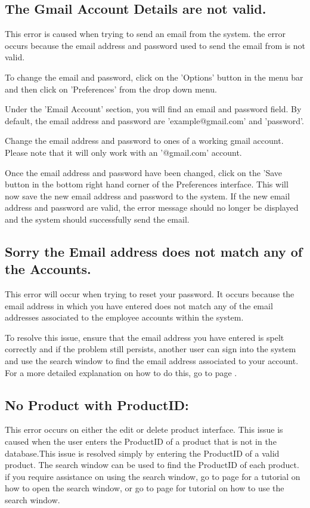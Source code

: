 \subsection{The Gmail Account Details are not valid.}

This error is caused when trying to send an email from the system. the error occurs because the email address and password used to send the email from is not valid.

To change the email and password, click on the 'Options' button in the menu bar and then click on 'Preferences' from the drop down menu.

Under the 'Email Account' section, you will find an email and password field. By default, the email address and password are 'example@gmail.com' and 'password'.

Change the email address and password to ones of a working gmail account. Please note that it will only work with an '@gmail.com' account.

Once the email address and password have been changed, click on the 'Save button in the bottom right hand corner of the Preferences interface. This will now save the new email address and password to the system. If the new email address and password are valid, the error message should no longer be displayed and the system should successfully send the email.

\subsection{Sorry the Email address does not match any of the Accounts.}

This error will occur when trying to reset your password. It occurs because the email address in which you have entered does not match any of the email addresses associated to the employee accounts within the system.

To resolve this issue, ensure that the email address you have entered is spelt correctly and if the problem still persists, another user can sign into the system and use the search window to find the email address associated to your account. For a more detailed explanation on how to do this, go to page \pageref{fig:Using the search window}.

\subsection{No Product with ProductID:}

This error occurs on either the edit or delete product interface. This issue is caused when the user enters the ProductID of a product that is not in the database.This issue is resolved simply by entering the ProductID of a valid product. The search window can be used to find the ProductID of each product. if you require assistance on using the search window, go to page \pageref{fig:Accessing the search window} for a tutorial on how to open the search window, or go to page \pageref{fig:Using the search window} for tutorial on how to use the search window.

